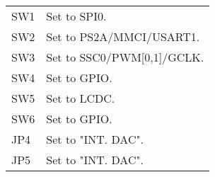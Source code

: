 \begin{table}
\begin{tabular}{|l|l|}

SW1 &
Set to SPI0.
\\

SW2 &
Set to PS2A/MMCI/USART1.
\\

SW3 &
Set to SSC0/PWM[0,1]/GCLK.
\\

SW4 &
Set to GPIO.
\\

SW5 &
Set to LCDC.
\\

SW6 &
Set to GPIO.
\\

JP4 &
Set to "INT. DAC".
\\

JP5 &
Set to "INT. DAC".
\\

\end{tabular}
\end{table}
